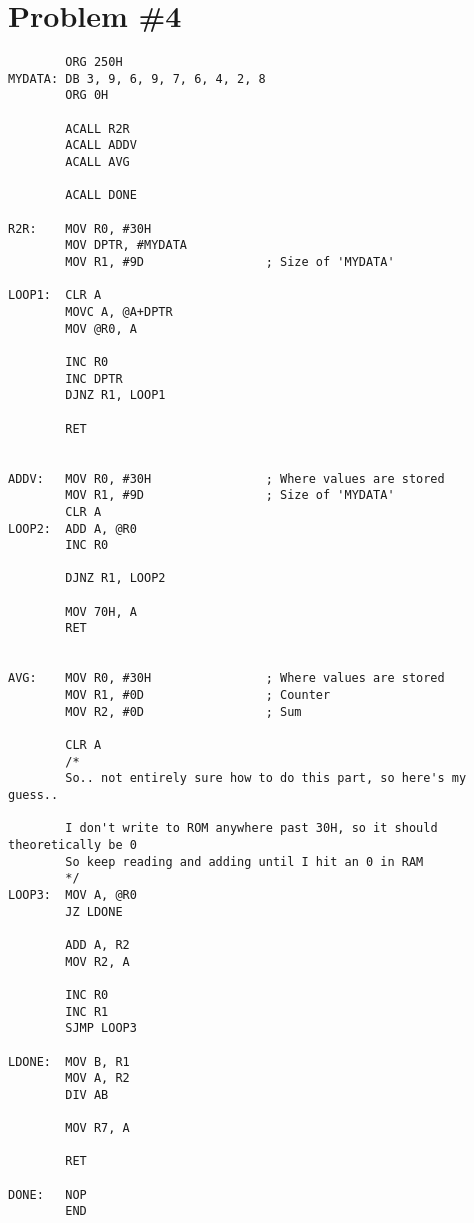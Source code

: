 \documentclass[12pt]{article}
\begin{document}
\section{Problem \#4}
\begin{verbatim}
        ORG 250H
MYDATA: DB 3, 9, 6, 9, 7, 6, 4, 2, 8
        ORG 0H

        ACALL R2R
        ACALL ADDV
        ACALL AVG

        ACALL DONE

R2R:    MOV R0, #30H
        MOV DPTR, #MYDATA
        MOV R1, #9D                 ; Size of 'MYDATA'

LOOP1:  CLR A
        MOVC A, @A+DPTR
        MOV @R0, A

        INC R0
        INC DPTR
        DJNZ R1, LOOP1

        RET


ADDV:   MOV R0, #30H                ; Where values are stored
        MOV R1, #9D                 ; Size of 'MYDATA'
        CLR A
LOOP2:  ADD A, @R0
        INC R0

        DJNZ R1, LOOP2

        MOV 70H, A
        RET


AVG:    MOV R0, #30H                ; Where values are stored
        MOV R1, #0D                 ; Counter
        MOV R2, #0D                 ; Sum

        CLR A
        /*
        So.. not entirely sure how to do this part, so here's my guess..

        I don't write to ROM anywhere past 30H, so it should theoretically be 0
        So keep reading and adding until I hit an 0 in RAM
        */
LOOP3:  MOV A, @R0
        JZ LDONE

        ADD A, R2
        MOV R2, A

        INC R0
        INC R1
        SJMP LOOP3

LDONE:  MOV B, R1
        MOV A, R2
        DIV AB

        MOV R7, A

        RET

DONE:   NOP
        END
\end{verbatim}
\end{document}
